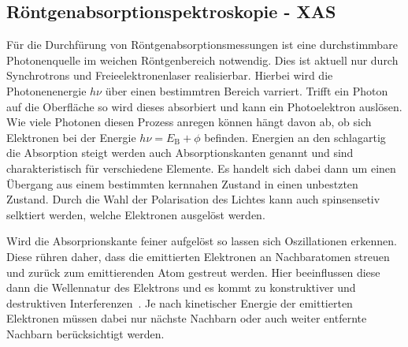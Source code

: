         \subsection{Röntgenabsorptionspektroskopie - XAS}
            Für die Durchfürung von Röntgenabsorptionsmessungen ist eine durchstimmbare Photonenquelle im weichen Röntgenbereich notwendig.
            Dies ist aktuell nur durch Synchrotrons und Freieelektronenlaser realisierbar.
            Hierbei wird die Photonenenergie $h\nu$ über einen bestimmtren Bereich varriert. %
            Trifft ein Photon auf die Oberfläche so wird dieses absorbiert und kann ein Photoelektron auslösen.
            Wie viele Photonen diesen Prozess anregen können hängt davon ab, ob sich Elektronen bei der Energie $h\nu = E_\text{B}+\phi$ befinden.
            Energien an den schlagartig die Absorption steigt werden auch Absorptionskanten genannt und sind charakteristisch für verschiedene Elemente. 
            Es handelt sich dabei dann um einen Übergang aus einem bestimmten kernnahen Zustand in einen unbestzten Zustand.
            Durch die Wahl der Polarisation des Lichtes kann auch spinsensetiv selktiert werden, welche Elektronen ausgelöst werden.

            Wird die Absorprionskante feiner aufgelöst so lassen sich Oszillationen erkennen.
            Diese rühren daher, dass die emittierten Elektronen an Nachbaratomen streuen und zurück zum emittierenden Atom gestreut werden.
            Hier beeinflussen diese dann die Wellennatur des Elektrons und es kommt zu konstruktiver und destruktiven Interferenzen~\cite{Fauster}.
            Je nach kinetischer Energie der emittierten Elektronen müssen dabei nur nächste Nachbarn oder auch weiter entfernte Nachbarn berücksichtigt werden.
            
